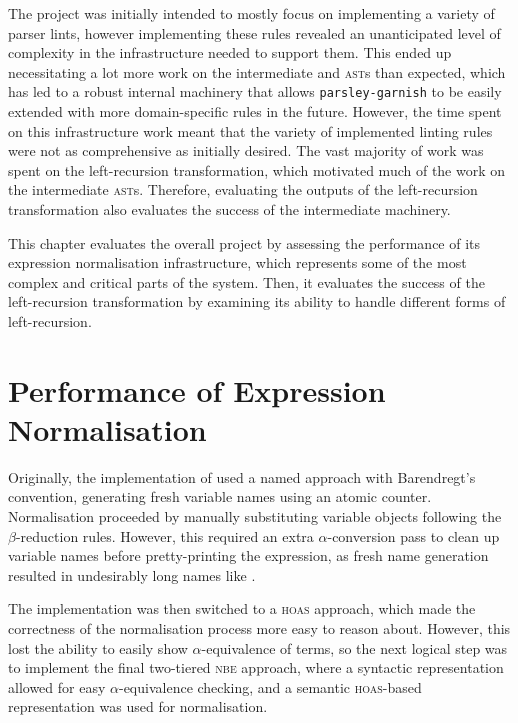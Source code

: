 \documentclass[../../main.tex]{subfiles}
\begin{document}
\label{sec:evaluation}

The project was initially intended to mostly focus on implementing a variety of parser lints, however implementing these rules revealed an unanticipated level of complexity in the infrastructure needed to support them.
This ended up necessitating a lot more work on the intermediate  and  \textsc{ast}s than expected, which has led to a robust internal machinery that allows \texttt{parsley-garnish} to be easily extended with more domain-specific rules in the future.
However, the time spent on this infrastructure work meant that the variety of implemented linting rules were not as comprehensive as initially desired.
The vast majority of work was spent on the left-recursion transformation, which motivated much of the work on the intermediate \textsc{ast}s.
Therefore, evaluating the outputs of the left-recursion transformation also evaluates the success of the intermediate machinery.

This chapter evaluates the overall project by assessing the performance of its expression normalisation infrastructure, which represents some of the most complex and critical parts of the system.
Then, it evaluates the success of the left-recursion transformation by examining its ability to handle different forms of left-recursion.

\section{Performance of Expression Normalisation}\label{sec:eval-exprs}
Originally, the implementation of  used a named approach with Barendregt's convention, generating fresh variable names using an atomic counter.
Normalisation proceeded by manually substituting variable objects following the $\beta$-reduction rules.
However, this required an extra $\alpha$-conversion pass to clean up variable names before pretty-printing the expression, as fresh name generation resulted in undesirably long names like .

The implementation was then switched to a \textsc{hoas} approach, which made the correctness of the normalisation process more easy to reason about.
However, this lost the ability to easily show $\alpha$-equivalence of terms, so the next logical step was to implement the final two-tiered \textsc{nbe} approach, where a syntactic representation allowed for easy $\alpha$-equivalence checking, and a semantic \textsc{hoas}-based representation was used for normalisation.
\end{document}
